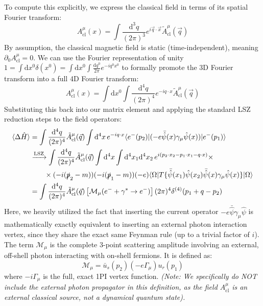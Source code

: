 To compute this explicitly, we express the classical field in terms of its spatial Fourier transform:
\[
    A^\mu_{\text{cl}}(x) = \int \frac{\mathrm{d}^3 q}{(2\pi)^3} e^{i \vec{q} \cdot \vec{x}} \tilde{A}^\mu_{\text{cl}}(\vec{q})
\]
By assumption, the classical magnetic field is static (time-independent), meaning $\partial_0 A^\mu_{\text{cl}} = 0$. We can use the Fourier representation of unity $1 = \int \mathrm{d}x^0 \delta(x^0) = \int \mathrm{d}x^0 \int \frac{\mathrm{d}q^0}{2\pi} e^{-i q^0 x^0}$ to formally promote the 3D Fourier transform into a full 4D Fourier transform:
\[
    A^\mu_{\text{cl}}(x) = \int \mathrm{d}x^0 \int \frac{\mathrm{d}^4 q}{(2\pi)^4} e^{-i q \cdot x} \tilde{A}^\mu_{\text{cl}}(\vec{q})
\]
Substituting this back into our matrix element and applying the standard LSZ reduction steps to the field operators:
\[
    \begin{aligned}
        \langle \Delta \hat{H} \rangle & = \int \frac{\mathrm{d}^4 q}{(2\pi)^4} \tilde{A}^\mu_{\text{cl}}(\vec{q}) \int \mathrm{d}^4 x \, e^{-i q \cdot x} \langle e^-(p_2) | (-e \bar{\hat{\psi}}(x) \gamma_\mu \hat{\psi}(x)) | e^-(p_1) \rangle              \\
                                       & \xrightarrow{\text{LSZ}} \int \frac{\mathrm{d}^4 q}{(2\pi)^4} \tilde{A}^\mu_{\text{cl}}(\vec{q}) \int \mathrm{d}^4 x \int \mathrm{d}^4 x_1 \mathrm{d}^4 x_2 \, e^{i(p_2 \cdot x_2 - p_1 \cdot x_1 - q \cdot x)} \times \\
                                       & \qquad \times (-i(\slashed{p}_2 - m)) (-i(\slashed{p}_1 - m)) (-e) \langle \Omega | T \{ \bar{\hat{\psi}}(x_1) \hat{\psi}(x_2) \bar{\hat{\psi}}(x) \gamma_\mu \hat{\psi}(x) \} | \Omega \rangle                        \\
                                       & = \int \frac{\mathrm{d}^4 q}{(2\pi)^4} \tilde{A}^\mu_{\text{cl}}(\vec{q}) \left[ \mathcal{M}_\mu(e^- + \gamma^* \to e^-) \right] (2\pi)^4 \delta^{(4)}(p_1 + q - p_2)
    \end{aligned}
\]
Here, we heavily utilized the fact that inserting the current operator $-e \bar{\hat{\psi}} \gamma_\mu \hat{\psi}$ is mathematically exactly equivalent to inserting an external photon interaction vertex, since they share the exact same Feynman rule (up to a trivial factor of $i$).
The term $\mathcal{M}_\mu$ is the complete 3-point scattering amplitude involving an external, off-shell photon interacting with on-shell fermions. It is defined as:
\[
    \mathcal{M}_\mu = \bar{u}_s(p_2) (-e \Gamma_\mu) u_r(p_1)
\]
where $-i \Gamma_\mu$ is the full, exact 1PI vertex function. \textit{(Note: We specifically do NOT include the external photon propagator in this definition, as the field $A^\mu_{\text{cl}}$ is an external classical source, not a dynamical quantum state).}

